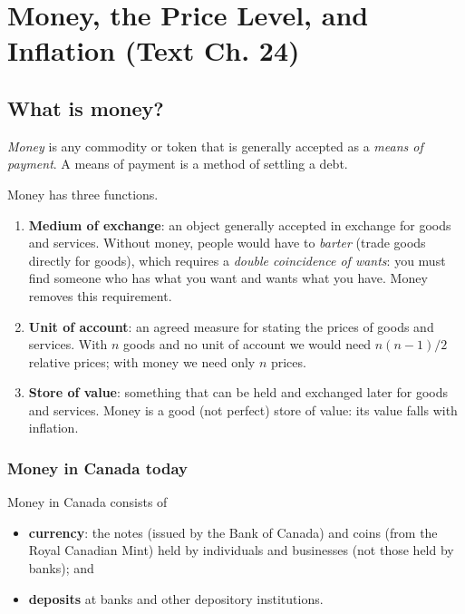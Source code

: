 \chapter{Money, the Price Level, and Inflation (Text Ch. 24)}

\section{What is money?}

\begin{definition}[Money]
\emph{Money} is any commodity or token that is generally accepted as a \emph{means of
payment}. A means of payment is a method of settling a debt.
\end{definition}

Money has three functions.
\begin{enumerate}
  \item \textbf{Medium of exchange}: an object generally accepted in exchange for goods
        and services. Without money, people would have to \emph{barter} (trade goods
        directly for goods), which requires a \emph{double coincidence of wants}: you must
        find someone who has what you want and wants what you have. Money removes this
        requirement.
  \item \textbf{Unit of account}: an agreed measure for stating the prices of goods and
        services. With $n$ goods and no unit of account we would need
        $n(n-1)/2$ relative prices; with money we need only $n$ prices.
  \item \textbf{Store of value}: something that can be held and exchanged later for goods
        and services. Money is a good (not perfect) store of value: its value falls with
        inflation.
\end{enumerate}

\subsection{Money in Canada today}

Money in Canada consists of
\begin{itemize}
  \item \textbf{currency}: the notes (issued by the Bank of Canada) and coins (from the
        Royal Canadian Mint) held by individuals and businesses (not those held by banks);
        and
  \item \textbf{deposits} at banks and other depository institutions.
\end{itemize}

